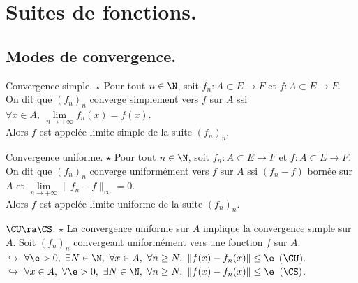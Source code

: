 \documentclass[11pt]{article}
\begin{document}


\thispagestyle{fancy}

\vspace*{-0.8cm}

\section{Suites de fonctions.}

\vspace*{-0.4cm}

\subsection{Modes de convergence.}

\begin{defi}{Convergence simple. $\star$}{}
    Pour tout $n\in\N$, soit $f_n:A\subset E \to F$ et $f:A\subset E \to F$.\\
    On dit que $(f_n)_n$ converge simplement vers $f$ sur $A$ ssi $\forall x \in A, ~ \lim\limits_{n\to+\infty} f_n(x) = f(x)$.\\[-0.14cm]
    Alors $f$ est appelée limite simple de la suite $(f_n)_n$.
\end{defi}

\vspace*{-0.8cm}

\begin{defi}{Convergence uniforme. $\star$}{}
    Pour tout $n\in\N$, soit $f_n:A\subset E \to F$ et $f:A\subset E \to F$.\\
    On dit que $(f_n)_n$ converge uniformément vers $f$ sur $A$ ssi $(f_n-f)$ bornée sur $A$ et $\lim\limits_{n\to+\infty} \|f_n - f\|_\infty = 0$.\\[-0.14cm]
    Alors $f$ est appelée limite uniforme de la suite $(f_n)_n$.
\end{defi}

\vspace*{-0.8cm}

\begin{prop}{$\CU \ra \CS$. $\star$}{}
    La convergence uniforme sur $A$ implique la convergence simple sur $A$.
    \tcblower
    Soit $(f_n)_n$ convergeant uniformément vers une fonction $f$ sur $A$.\\
    $\hookrightarrow$ $\forall \e > 0, ~ \exists N \in \N, ~ \forall x \in A, ~ \forall n \geq N, ~ \|f(x) - f_n(x)\| \leq \e$ ($\CU$).\\
    $\hookrightarrow$ $\forall x \in A, ~ \forall \e > 0, ~ \exists N \in \N, ~ \forall n \geq N, ~ \|f(x) - f_n(x)\|\leq \e$ $(\CS)$.
\end{prop}
\end{document}

